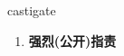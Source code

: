 
\begin{frame}
{\huge castigate}
\begin{center}
\begin{enumerate}\Large
  \item \textbf{强烈(公开)指责}
\end{enumerate}
\end{center}
\end{frame}
